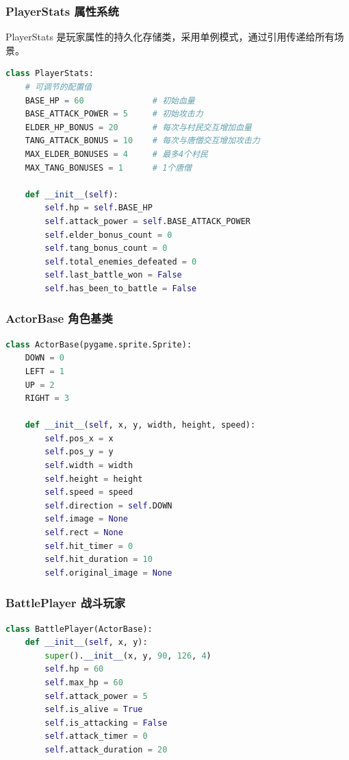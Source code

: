 \documentclass[12pt,a4paper]{article}
\begin{document}
\subsubsection{PlayerStats 属性系统}

PlayerStats 是玩家属性的持久化存储类，采用单例模式，通过引用传递给所有场景。

\begin{lstlisting}[language=Python,caption={PlayerStats类定义}]
class PlayerStats:
    # 可调节的配置值
    BASE_HP = 60              # 初始血量
    BASE_ATTACK_POWER = 5     # 初始攻击力
    ELDER_HP_BONUS = 20       # 每次与村民交互增加血量
    TANG_ATTACK_BONUS = 10    # 每次与唐僧交互增加攻击力
    MAX_ELDER_BONUSES = 4     # 最多4个村民
    MAX_TANG_BONUSES = 1      # 1个唐僧

    def __init__(self):
        self.hp = self.BASE_HP
        self.attack_power = self.BASE_ATTACK_POWER
        self.elder_bonus_count = 0
        self.tang_bonus_count = 0
        self.total_enemies_defeated = 0
        self.last_battle_won = False
        self.has_been_to_battle = False
\end{lstlisting}

\subsubsection{ActorBase 角色基类}

\begin{lstlisting}[language=Python,caption={ActorBase类定义}]
class ActorBase(pygame.sprite.Sprite):
    DOWN = 0
    LEFT = 1
    UP = 2
    RIGHT = 3

    def __init__(self, x, y, width, height, speed):
        self.pos_x = x
        self.pos_y = y
        self.width = width
        self.height = height
        self.speed = speed
        self.direction = self.DOWN
        self.image = None
        self.rect = None
        self.hit_timer = 0
        self.hit_duration = 10
        self.original_image = None
\end{lstlisting}

\subsubsection{BattlePlayer 战斗玩家}

\begin{lstlisting}[language=Python,caption={BattlePlayer类定义}]
class BattlePlayer(ActorBase):
    def __init__(self, x, y):
        super().__init__(x, y, 90, 126, 4)
        self.hp = 60
        self.max_hp = 60
        self.attack_power = 5
        self.is_alive = True
        self.is_attacking = False
        self.attack_timer = 0
        self.attack_duration = 20
\end{lstlisting}
\end{document}
